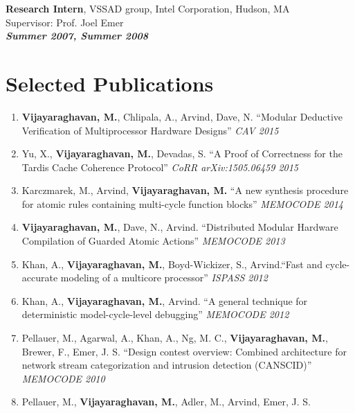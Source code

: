 \documentclass[margin,line]{resume}
\begin{document}
\begin{resume}
    \vspace{-7mm}
    \textbf{Research Intern}, VSSAD group, Intel Corporation, Hudson, MA\\
    Supervisor: Prof. Joel Emer \\
\hfill \textbf{\textit{Summer 2007, Summer 2008}}\\
    \vspace{-9mm}
    \section{\mysidestyle Selected Publications}
    \begin{enumerate}
    \item \textbf{Vijayaraghavan, M.}, Chlipala, A., Arvind, Dave, N.
    ``Modular Deductive Verification of Multiprocessor Hardware Designs'' \textit{CAV 2015}
    \item Yu, X., \textbf{Vijayaraghavan, M.}, Devadas, S.
    ``A Proof of Correctness for the Tardis Cache Coherence Protocol'' \textit{CoRR arXiv:1505.06459 2015}
    \item Karczmarek, M., Arvind, \textbf{Vijayaraghavan, M.}
    ``A new synthesis procedure for atomic rules containing multi-cycle function blocks'' \textit{MEMOCODE 2014}
    \item \textbf{Vijayaraghavan, M.}, Dave, N., Arvind.
    ``Distributed Modular Hardware Compilation of Guarded Atomic Actions'' \textit{MEMOCODE 2013}
    \item Khan, A., \textbf{Vijayaraghavan, M.}, Boyd-Wickizer, S., Arvind.``Fast and cycle-accurate modeling of 
    a multicore processor''
    \textit {ISPASS 2012}
    \item Khan, A., \textbf{Vijayaraghavan, M.}, Arvind. ``A general technique for deterministic model-cycle-level debugging''
    \textit{MEMOCODE 2012}
    \item Pellauer, M., Agarwal, A., Khan, A., Ng, M. C., \textbf{Vijayaraghavan, M.}, Brewer, F., Emer, J. S. 
    ``Design contest overview: Combined architecture for network stream categorization and intrusion detection (CANSCID)''
    \textit{MEMOCODE 2010}
    \item Pellauer, M., \textbf{Vijayaraghavan, M.}, Adler, M., Arvind, Emer, J. S.

\end{enumerate}
\end{resume}
\end{document}
